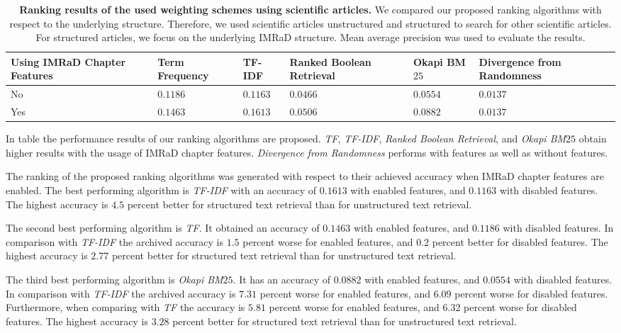 \begin{table}[b!]
    \centering
    \begin{tabular}{ C{2.1cm} C{2.1cm} C{2.1cm} C{2.1cm} C{2.1cm} C{2.1cm} }
      \toprule
      \textbf{Using IMRaD Chapter Features} & \textbf{Term Frequency} & \textbf{TF-IDF} & \textbf{Ranked Boolean Retrieval} & \textbf{Okapi BM$25$} & \textbf{Divergence from Randomness} \\ \midrule
      No  & $0.1186$ & $0.1163$ & $0.0466$ & $0.0554$ & $0.0137$ \\
      Yes & $0.1463$ & $0.1613$ & $0.0506$ & $0.0882$ & $0.0137$ \\
      \bottomrule
    \end{tabular}
  \caption[Ranking results using scientific articles]{\textbf{Ranking results of the used weighting schemes using scientific articles.} We compared our proposed ranking algorithms with respect to the underlying structure. Therefore, we used scientific articles unstructured and structured to search for other scientific articles. For structured articles, we focus on the underlying IMRaD structure. Mean average precision was used to evaluate the results.}
  \label{tbl:ranking_result_full}
\end{table}

In table  the performance results of our ranking algorithms are proposed. \textit{TF}, \textit{TF-IDF}, \textit{Ranked Boolean Retrieval}, and \textit{Okapi BM$25$} obtain higher results with the usage of IMRaD chapter features. \textit{Divergence from Randomness} performs with features as well as without features.

The ranking of the proposed ranking algorithms was generated with respect to their achieved accuracy when IMRaD chapter features are enabled.  The best performing algorithm is \textit{TF-IDF} with an accuracy of $0.1613$ with enabled features, and $0.1163$ with disabled features. The highest accuracy is $4.5$ percent better for structured text retrieval than for unstructured text retrieval.

The second best performing algorithm is \textit{TF}. It obtained an accuracy of $0.1463$ with enabled features, and $0.1186$ with disabled features. In comparison with \textit{TF-IDF} the archived accuracy is $1.5$ percent worse for enabled features, and $0.2$ percent better for disabled features. The highest accuracy is $2.77$ percent better for structured text retrieval than for unstructured text retrieval.

The third best performing algorithm is \textit{Okapi BM$25$}. It has an accuracy of $0.0882$ with enabled features, and $0.0554$ with disabled features. In comparison with \textit{TF-IDF} the archived accuracy is $7.31$ percent worse for enabled features, and $6.09$ percent worse for disabled features. Furthermore, when comparing with \textit{TF} the accuracy is $5.81$ percent worse for enabled features, and $6.32$ percent worse for disabled features. The highest accuracy is $3.28$ percent better for structured text retrieval than for unstructured text retrieval.

